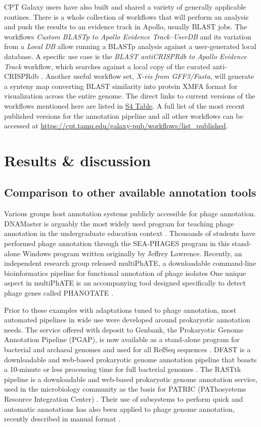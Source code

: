 CPT Galaxy users have also built and shared a variety of generally
applicable routines. There is a whole collection of workflows that will
perform an analysis and push the results to an evidence track in Apollo,
usually BLAST jobs. The workflows \emph{Custom BLASTp to Apollo Evidence
Track--UserDB} and its variation from a \emph{Local DB} allow running a
BLASTp analysis against a user-generated local database. A specific use
case is the \emph{BLAST antiCRISPRdb to Apollo Evidence Track} workflow,
which searches against a local copy of the curated anti-CRISPRdb
\cite{Dong_2017}. Another useful workflow set, \emph{X-vis from GFF3/Fasta},
will generate a synteny map converting BLAST similarity into protein
XMFA format for visualization across the entire genome. The direct links
to current versions of the workflows mentioned here are listed in
\protect\hyperlink{pcbi.1008214.s004}{S4 Table}. A full list of the most
recent published versions for the annotation pipeline and all other
workflows can be accessed at
\url{https://cpt.tamu.edu/galaxy-pub/workflows/list_published}.

\section*{Results \& discussion}

\subsection*{Comparison to other available annotation tools}

Various groups host annotation systems publicly accessible for phage
annotation. DNAMaster is arguably the most widely used program for
teaching phage annotation in the undergraduate education context
\cite{Jordan_2014}. Thousands of students have performed phage annotation through
the SEA-PHAGES program in this stand-alone Windows program written
originally by Jeffrey Lawrence. Recently, an independent research group
released multiPhATE, a downloadable command-line bioinformatics pipeline
for functional annotation of phage isolates \cite{Ecale_Zhou_2019} One unique aspect in
multiPhATE is an accompanying tool designed specifically to detect phage
genes called PHANOTATE \cite{McNair_2019}.

Prior to these examples with adaptations tuned to phage annotation, most
automated pipelines in wide use were developed around prokaryotic
annotation needs. The service offered with deposit to Genbank, the
Prokaryotic Genome Annotation Pipeline (PGAP), is now available as a
stand-alone program for bacterial and archaeal genomes and used for all
RefSeq sequences \cite{Tatusova_2016,Haft_2017}. DFAST is a downloadable and web-based
prokaryotic genome annotation pipeline that boasts a 10-minute or less
processing time for full bacterial genomes \cite{Tanizawa_2017}. The RASTtk pipeline
is a downloadable and web-based prokaryotic genome annotation service,
used in the microbiology community as the basis for PATRIC (PAThosystems
Resource Integration Center) \cite{Aziz_2008,Overbeek_2013}. Their use of subsystems to
perform quick and automatic annotations has also been applied to phage
genome annotation, recently described in manual format \cite{McNair_2017}.

